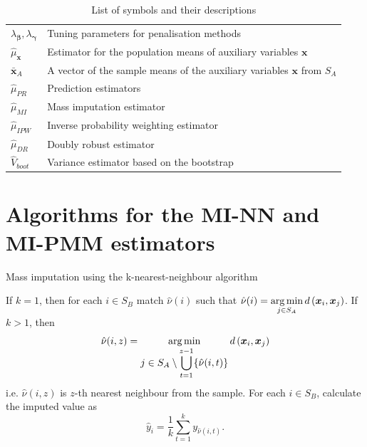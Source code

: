 \documentclass[
]{jss}
\begin{document}
\begin{table}[ht!]
\begin{tabular}{ll}
$\lambda_{\boldsymbol{\beta}}, \lambda_{\boldsymbol{\gamma}}$ & Tuning parameters for penalisation methods \\
$\hat{\mu}_{\boldsymbol{x}}$ & Estimator for the population means of auxiliary variables $\boldsymbol{x}$ \\
$\bar{\boldsymbol{x}}_{A}$ & A vector of the sample means of the auxiliary variables $\boldsymbol{x}$ from $S_A$ \\ 
$\hat{\mu}_{PR}$ & Prediction estimators \\
$\hat{\mu}_{MI}$ & Mass imputation estimator \\
$\hat{\mu}_{IPW}$ & Inverse probability weighting estimator \\
$\hat{\mu}_{DR}$ & Doubly robust estimator \\
$\hat{V}_{boot}$ & Variance estimator based on the bootstrap \\
\hline
\end{tabular}
\caption{List of symbols and their descriptions}
\label{tab-list-of-symbols}
\end{table}

\clearpage

\section{Algorithms for the MI-NN and MI-PMM
estimators}\label{sec-details}

\begin{algorithm}[ht!]
\caption{Mass imputation using the k-nearest-neighbour algorithm}
\label{algo-2}
\begin{algorithmic}[1]
\State If $k=1$, then for each $i \in S_B$ match $\hat{\nu}(i)$ such that
$\displaystyle \hat{\nu}(i)=
\operatornamewithlimits{arg\,min}_{j\in S_{A}}d\left(\boldsymbol{x}_i,\boldsymbol{x}_j\right)$.
\State If $k>1$, then
$$\hat{\nu}(i, z) = \operatornamewithlimits{arg\,min}_{\displaystyle j\in S_{A}\setminus\bigcup_{t=1}^{z-1}
\{\hat{\nu}(i, t)\}} d\left(\boldsymbol{x}_i, \boldsymbol{x}_j\right)$$
i.e. $\hat{\nu}(i, z)$ is $z$-th nearest neighbour from the sample.\;
\State For each $i \in S_B$, calculate the imputed value as
$$
\hat{y}_i = \frac{1}{k}\sum_{t=1}^{k}y_{\hat{\nu}(i, t)}.
$$
\end{algorithmic}
\end{algorithm}
\end{document}
